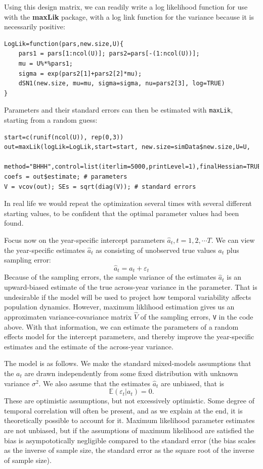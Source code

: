 \documentclass[11pt]{article}
\newcommand{\be}{\begin{equation}}
\newcommand{\ee}{\end{equation}}
\begin{document}
{Using this design matrix, we can readily write a log likelihood function for use with 
the \textbf{maxLik} package, with a log link function for the variance because it is necessarily positive: 
\begin{lstlisting}
LogLik=function(pars,new.size,U){
    pars1 = pars[1:ncol(U)]; pars2=pars[-(1:ncol(U))];
    mu = U%*%pars1;  
    sigma = exp(pars2[1]+pars2[2]*mu);
    dSN1(new.size, mu=mu, sigma=sigma, nu=pars2[3], log=TRUE)
}
\end{lstlisting} 

Parameters and their standard errors can then be estimated with \texttt{maxLik}, 
starting from a random guess: 
\begin{lstlisting}
start=c(runif(ncol(U)), rep(0,3))
out=maxLik(logLik=LogLik,start=start, new.size=simData$new.size,U=U,
  method="BHHH",control=list(iterlim=5000,printLevel=1),finalHessian=TRUE);
coefs = out$estimate; # parameters
V = vcov(out); SEs = sqrt(diag(V));	# standard errors 
\end{lstlisting}  
In real life we would repeat the optimization several times with several different starting values, to be confident that
the optimal parameter values had been found. 

Focus now on the year-specific intercept parameters $\hat{a}_t, t = 1,2,\cdots T$. 
We can view the year-specific estimates $\hat{a}_t$ as consisting of unobserved true values $a_t$ plus sampling error:
\be
\hat{a}_t= a_t + \varepsilon_t 
\ee
Because of the sampling errors, the sample variance of
the estimates $\hat{a}_t$ is an upward-biased estimate of the true across-year variance in the parameter. 
That is undesirable if the model will be used to project how temporal variability affects population dynamics. 
However, maximum liklihood estimation gives us an approximaten variance-covariance matrix $\hat{V}$ of the
sampling errors, \texttt{V} in the code above. With that information, we can estimate the parameters
of a random effects model for the intercept parameters, and thereby improve the year-specific estimates and
the estimate of the across-year variance.  

The model is as follows. We make the standard mixed-models assumptions that the $a_t$ are drawn 
independently from some fixed distribution with unknown variance $\sigma^2$. We also assume that the estimates 
$\hat{a}_t$ are unbiased, that is
\be
\mathbb{E}(\varepsilon_t \vert a_t) = 0.    
\ee
These are optimistic assumptions, but not excessively optimistic. Some degree of temporal correlation will often be
present, and as we explain at the end, it is theoretically possible to account for it. 
Maximum likelihood parameter estimates are not unbiased, but if the assumptions
of maximum likelihood are satisfied the bias is asympototically negligible compared to the standard error (the 
bias scales as the inverse of sample size, the standard error as the square root of the inverse of sample size).  

}
\end{document}
